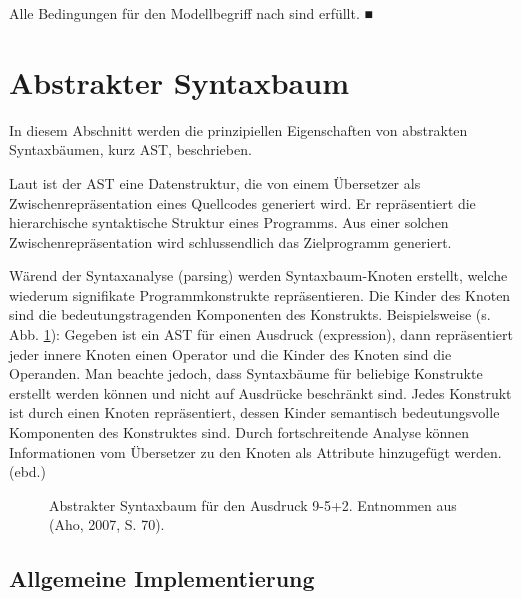 Alle Bedingungen für den Modellbegriff nach \citep{Stachowiak} sind erfüllt. ■

 
\section{Abstrakter Syntaxbaum}\label{ast}
 
In diesem Abschnitt werden die prinzipiellen Eigenschaften von abstrakten Syntaxbäumen, kurz AST, beschrieben.

 
Laut \citep{Aho} ist der AST eine Datenstruktur, die von einem Übersetzer als Zwischenrepräsentation eines Quellcodes generiert wird. Er repräsentiert die hierarchische syntaktische Struktur eines Programms. Aus einer solchen Zwischenrepräsentation wird schlussendlich das Zielprogramm generiert.

 
Wärend der Syntaxanalyse (parsing) werden Syntaxbaum-Knoten erstellt, welche wiederum signifikate Programmkonstrukte repräsentieren. Die Kinder des Knoten sind die bedeutungstragenden Komponenten des Konstrukts. Beispielsweise (s. Abb. \ref{ast}): Gegeben ist ein AST für einen Ausdruck (expression), dann repräsentiert jeder innere Knoten einen Operator und die Kinder des Knoten sind die Operanden. Man beachte jedoch, dass Syntaxbäume für beliebige Konstrukte erstellt werden können und nicht auf Ausdrücke beschränkt sind. Jedes Konstrukt ist durch einen Knoten repräsentiert, dessen Kinder semantisch bedeutungsvolle Komponenten des Konstruktes sind. Durch fortschreitende Analyse können Informationen vom Übersetzer zu den Knoten als Attribute hinzugefügt werden. (ebd.)

 
\begin{figure}[h!]
\centering
\advance\leftskip-2.5cm
\caption{ Abstrakter Syntaxbaum für den Ausdruck 9-5+2. Entnommen aus (Aho, 2007, S. 70). }\label{ast}
\end{figure}
 
\subsection{Allgemeine Implementierung}\label{}
 

